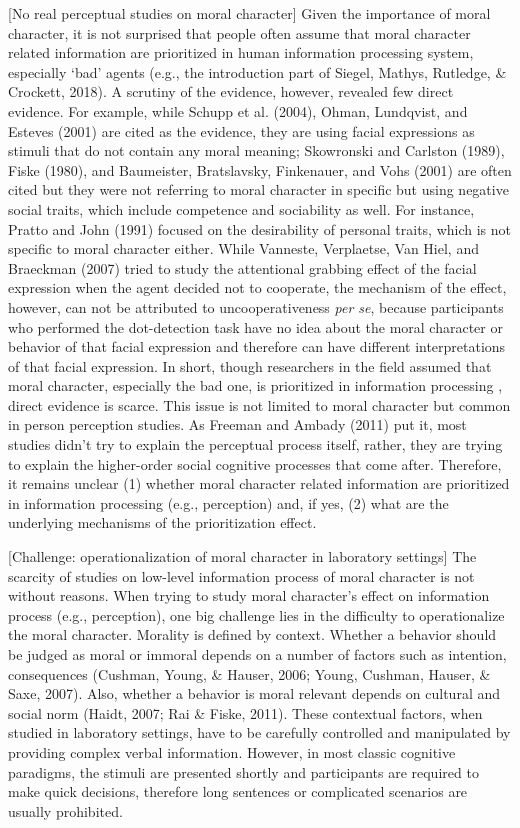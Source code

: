 \documentclass[
  english,
  man]{apa6}
\begin{document}
{[}No real perceptual studies on moral character{]}
Given the importance of moral character, it is not surprised that people often assume that moral character related information are prioritized in human information processing system, especially `bad' agents (e.g., the introduction part of Siegel, Mathys, Rutledge, \& Crockett, 2018). A scrutiny of the evidence, however, revealed few direct evidence. For example, while Schupp et al. (2004), Ohman, Lundqvist, and Esteves (2001) are cited as the evidence, they are using facial expressions as stimuli that do not contain any moral meaning; Skowronski and Carlston (1989), Fiske (1980), and Baumeister, Bratslavsky, Finkenauer, and Vohs (2001) are often cited but they were not referring to moral character in specific but using negative social traits, which include competence and sociability as well. For instance, Pratto and John (1991) focused on the desirability of personal traits, which is not specific to moral character either. While Vanneste, Verplaetse, Van Hiel, and Braeckman (2007) tried to study the attentional grabbing effect of the facial expression when the agent decided not to cooperate, the mechanism of the effect, however, can not be attributed to uncooperativeness \emph{per se}, because participants who performed the dot-detection task have no idea about the moral character or behavior of that facial expression and therefore can have different interpretations of that facial expression. In short, though researchers in the field assumed that moral character, especially the bad one, is prioritized in information processing , direct evidence is scarce. This issue is not limited to moral character but common in person perception studies. As Freeman and Ambady (2011) put it, most studies didn't try to explain the perceptual process itself, rather, they are trying to explain the higher-order social cognitive processes that come after. Therefore, it remains unclear (1) whether moral character related information are prioritized in information processing (e.g., perception) and, if yes, (2) what are the underlying mechanisms of the prioritization effect.

{[}Challenge: operationalization of moral character in laboratory settings{]}
The scarcity of studies on low-level information process of moral character is not without reasons. When trying to study moral character's effect on information process (e.g., perception), one big challenge lies in the difficulty to operationalize the moral character. Morality is defined by context. Whether a behavior should be judged as moral or immoral depends on a number of factors such as intention, consequences (Cushman, Young, \& Hauser, 2006; Young, Cushman, Hauser, \& Saxe, 2007). Also, whether a behavior is moral relevant depends on cultural and social norm (Haidt, 2007; Rai \& Fiske, 2011). These contextual factors, when studied in laboratory settings, have to be carefully controlled and manipulated by providing complex verbal information. However, in most classic cognitive paradigms, the stimuli are presented shortly and participants are required to make quick decisions, therefore long sentences or complicated scenarios are usually prohibited.
\end{document}
